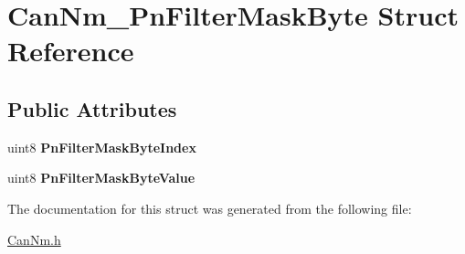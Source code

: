 \hypertarget{structCanNm__PnFilterMaskByte}{}\section{Can\+Nm\+\_\+\+Pn\+Filter\+Mask\+Byte Struct Reference}
\label{structCanNm__PnFilterMaskByte}
\subsection*{Public Attributes}
\begin{DoxyCompactItemize}
\item 
uint8 {\bfseries Pn\+Filter\+Mask\+Byte\+Index}\hypertarget{structCanNm__PnFilterMaskByte_aa86edca468a34527f552200c01ca8086}{}\label{structCanNm__PnFilterMaskByte_aa86edca468a34527f552200c01ca8086}

\item 
uint8 {\bfseries Pn\+Filter\+Mask\+Byte\+Value}\hypertarget{structCanNm__PnFilterMaskByte_a08402e48f24cba9aac899fea8db19223}{}\label{structCanNm__PnFilterMaskByte_a08402e48f24cba9aac899fea8db19223}

\end{DoxyCompactItemize}


The documentation for this struct was generated from the following file\+:\begin{DoxyCompactItemize}
\item 
\hyperlink{CanNm_8h}{Can\+Nm.\+h}\end{DoxyCompactItemize}
